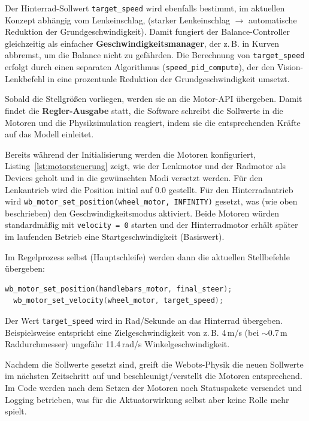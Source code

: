   Der Hinterrad-Sollwert \texttt{target\_speed} wird ebenfalls bestimmt, 
  im aktuellen Konzept abhängig vom Lenkeinschlag,
  (starker Lenkeinschlag $\rightarrow$ automatische Reduktion der Grundgeschwindigkeit). 
  Damit fungiert der Balance-Controller gleichzeitig als einfacher 
  \textbf{Geschwindigkeitsmanager}, 
  der z.\,B. in Kurven abbremst, um die Balance nicht zu gefährden. 
  Die Berechnung von \texttt{target\_speed} erfolgt durch einen separaten Algorithmus 
  (\texttt{speed\_pid\_compute}), 
  der den Vision-Lenkbefehl in eine prozentuale Reduktion der Grundgeschwindigkeit umsetzt. 

  Sobald die Stellgrößen vorliegen, werden sie an die Motor-API übergeben. 
  Damit findet die \textbf{Regler-Ausgabe} statt, 
  die Software schreibt die Sollwerte in die Motoren
  und die Physiksimulation reagiert, indem sie die entsprechenden Kräfte auf das Modell einleitet. 

  Bereits während der Initialisierung werden die Motoren konfiguriert,
  Listing~\ref{lst:motorsteuerung} zeigt, wie der Lenkmotor und der Radmotor als Devices geholt und in die gewünschten Modi versetzt werden. 
  Für den Lenkantrieb wird die Position initial auf $0.0$ gestellt. 
  Für den Hinterradantrieb wird \texttt{wb\_motor\_set\_position(wheel\_motor, INFINITY)} gesetzt, 
  was (wie oben beschrieben) den Geschwindigkeitsmodus aktiviert. 
  Beide Motoren würden standardmäßig mit \texttt{velocity = 0} starten und
  der Hinterradmotor erhält später im laufenden Betrieb eine Startgeschwindigkeit (Basiswert). 

  Im Regelprozess selbst (Hauptschleife) werden dann die aktuellen Stellbefehle übergeben:

  \begin{lstlisting}[language=C,caption={Motorsteuerung im Regelkreis},label={lst:motorsteuerung}]
  wb_motor_set_position(handlebars_motor, final_steer);
  wb_motor_set_velocity(wheel_motor, target_speed);
  \end{lstlisting}


  Der Wert \texttt{target\_speed} wird in Rad/Sekunde an das Hinterrad übergeben. 
  Beispielsweise entspricht eine Zielgeschwindigkeit von z.\,B. 4\,m/s 
  (bei $\sim$0.7\,m Raddurchmesser) ungefähr 11.4\,rad/s Winkelgeschwindigkeit. 

  Nachdem die Sollwerte gesetzt sind, greift die Webots-Physik die neuen Sollwerte im nächsten Zeitschritt auf 
  und beschleunigt/verstellt die Motoren entsprechend. 
  Im Code werden nach dem Setzen der Motoren noch Statuspakete versendet und Logging betrieben, 
  was für die Aktuatorwirkung selbst aber keine Rolle mehr spielt.



